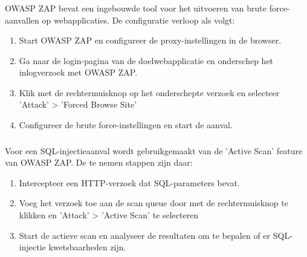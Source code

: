 \subsubsection{}
OWASP ZAP bevat een ingebouwde tool voor het uitvoeren van brute force-aanvallen op webapplicaties.
De configuratie verloop als volgt:
\begin{enumerate}
    \item Start OWASP ZAP en configureer de proxy-instellingen in de browser.
    \item Ga naar de login-pagina van de doelwebapplicatie en onderschep het inlogverzoek met OWASP ZAP.
    \item Klik met de rechtermuisknop op het onderschepte verzoek en selecteer 'Attack' > 'Forced Browse Site'
    \item Configureer de brute force-instellingen en start de aanval.
\end{enumerate}

\subsubsection{}
Voor een SQL-injectieaanval wordt gebruikgemaakt van de 'Active Scan' feature van OWASP ZAP.
De te nemen stappen zijn daar:
\begin{enumerate}
    \item Intercepteer een HTTP-verzoek dat SQL-parameters bevat.
    \item Voeg het verzoek toe aan de scan queue door met de rechtermuisknop te klikken en 'Attack' > 'Active Scan' te selecteren
    \item Start de actieve scan en analyseer de resultaten om te bepalen of er SQL-injectie kwetsbaarheden zijn.
\end{enumerate}